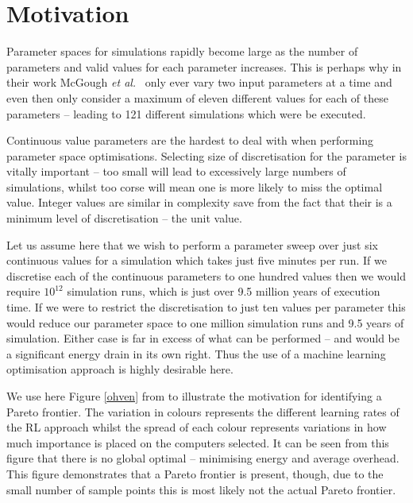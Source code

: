 \documentclass[10pt, conference, compsocconf]{IEEEtran}
\begin{document}

\section{Motivation}
\label{motivation}

Parameter spaces for simulations rapidly become large as the number of parameters and valid values for each parameter increases. This is perhaps why in their work McGough \textit{et al.}~\cite{suscom} only ever vary two input parameters at a time and even then only consider a maximum of eleven different values for each of these parameters -- leading to 121 different simulations which were be executed. 

Continuous value parameters are the hardest to deal with when performing parameter space optimisations. Selecting size of discretisation for the parameter is vitally important -- too small will lead to excessively large numbers of simulations, whilst too corse will mean one is more likely to miss the optimal value. Integer values are similar in complexity save from the fact that their is a minimum level of discretisation -- the unit value. 

Let us assume here that we wish to perform a parameter sweep over just six continuous values for a simulation which takes just five minutes per run. If we discretise each of the continuous parameters to one hundred values then we would require $10^{12}$ simulation runs, which is just over 9.5 million years of execution time. If we were to restrict the discretisation to just ten values per parameter this would reduce our parameter space to one million simulation runs and 9.5 years of simulation. Either case is far in excess of what can be performed -- and would be a significant energy drain in its own right. Thus the use of a machine learning optimisation approach is highly desirable here.

We use here Figure \ref{ohven} from \cite{suscom} to illustrate the motivation for identifying a Pareto frontier. The variation in colours represents the different learning rates of the RL approach whilst the spread of each colour represents variations in how much importance is placed on the computers selected. It can be seen from this figure that there is no global optimal -- minimising energy and average overhead. This figure demonstrates that a Pareto frontier is present, though, due to the small number of sample points this is most likely not the actual Pareto frontier.
\end{document}
